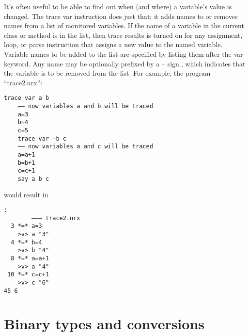 It’s often useful to be able to find out when (and where) a variable’s value is changed. The trace var instruction does just that; it adds names to or removes names from a list of monitored variables. If the name of a variable in the current class or method is in the list, then trace results is turned on for any assignment, loop, or parse instruction that assigns a new value to the named variable.
Variable names to be added to the list are specified by listing them after the var keyword. Any name may be optionally prefixed by a – sign., which indicates that the variable is to be removed from the list.
For example, the program “trace2.nrx”:
\begin{lstlisting}[label=trace2,caption=trace2.nrx]
    trace var a b
    –– now variables a and b will be traced
    a=3
    b=4
    c=5
    trace var –b c
    –– now variables a and c will be traced
    a=a+1
    b=b+1
    c=c+1
    say a b c
\end{lstlisting}
would result in
\begin{verbatim}:
        ––– trace2.nrx
  3 *=* a=3
    >v> a "3"
  4 *=* b=4
    >v> b "4"
  8 *=* a=a+1
    >v> a "4"
 10 *=* c=c+1
    >v> c "6"
45 6
\end{verbatim}

\section{Binary types and conversions}

